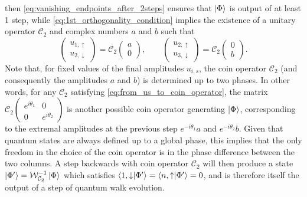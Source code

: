 then \cref{eq:vanishing_endpoints_after_2steps} ensures that $\ket\Phi$ is output of at least 1 step,
while \cref{eq:1st_orthogonality_condition} implies the existence of a unitary operator $\mathcal C_2$ and complex numbers $a$ and $b$ such that
\begin{equation}
	\begin{pmatrix}
		u_{1, \uparrow} \\ u_{2, \downarrow}
	\end{pmatrix}
	=
	\mathcal C_2
	\begin{pmatrix}
		a \\ 0
	\end{pmatrix},
	\qquad
	\begin{pmatrix}
		u_{2, \uparrow} \\ u_{3, \downarrow}
	\end{pmatrix}
	=
	\mathcal C_2
	\begin{pmatrix}
		0 \\ b
	\end{pmatrix}.
	\label{eq:from_us_to_coin_operator}
\end{equation}
Note that, for fixed values of the final amplitudes $u_{i,s}$, the coin operator $\mathcal C_2$ (and consequently the amplitudes $a$ and $b$) is determined up to two phases.
In other words, for any $\mathcal C_2$ satisfying \cref{eq:from_us_to_coin_operator}, the matrix
$\mathcal C_2 \begin{pmatrix}
	e^{i\theta_1} & 0 \\ 0 & e^{i\theta_2}
\end{pmatrix}$
is another possible coin operator generating $\ket\Phi$, corresponding to the extremal amplitudes at the previous step $e^{-i\theta_1}a$ and $e^{-i\theta_2}b$.
Given that quantum states are always defined up to a global phase, this implies that the only freedom in the choice of the coin operator is in the phase difference between the two columns.
A step backwards with coin operator $\mathcal C_2$ will then produce a state $\ket{\Phi'} = \mathcal{W}_{\mathcal C_2}^{-1}\ket\Phi$ which satisfies
$
\braket{1, \downarrow}{\Phi'} =
\braket{n, \uparrow}{\Phi'} = 0
$,
and is therefore itself the output of a step of quantum walk evolution.

